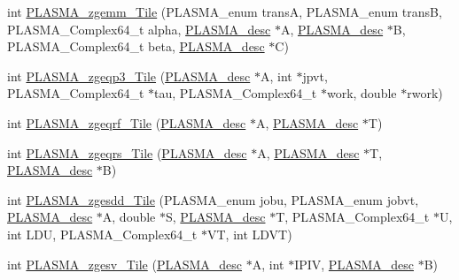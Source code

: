 \begin{DoxyCompactItemize}
\item 
int \hyperlink{group__PLASMA__Complex64__t__Tile_ga988b90795ec2367dc11590bc5dd05ada_ga988b90795ec2367dc11590bc5dd05ada}{P\+L\+A\+S\+M\+A\+\_\+zgemm\+\_\+\+Tile} (P\+L\+A\+S\+M\+A\+\_\+enum trans\+A, P\+L\+A\+S\+M\+A\+\_\+enum trans\+B, P\+L\+A\+S\+M\+A\+\_\+\+Complex64\+\_\+t alpha, \hyperlink{structplasma__desc__t}{P\+L\+A\+S\+M\+A\+\_\+desc} $\ast$A, \hyperlink{structplasma__desc__t}{P\+L\+A\+S\+M\+A\+\_\+desc} $\ast$B, P\+L\+A\+S\+M\+A\+\_\+\+Complex64\+\_\+t beta, \hyperlink{structplasma__desc__t}{P\+L\+A\+S\+M\+A\+\_\+desc} $\ast$C)
\item 
int \hyperlink{group__PLASMA__Complex64__t__Tile_gae051c23d919a445b0cc2773c8ffa62be_gae051c23d919a445b0cc2773c8ffa62be}{P\+L\+A\+S\+M\+A\+\_\+zgeqp3\+\_\+\+Tile} (\hyperlink{structplasma__desc__t}{P\+L\+A\+S\+M\+A\+\_\+desc} $\ast$A, int $\ast$jpvt, P\+L\+A\+S\+M\+A\+\_\+\+Complex64\+\_\+t $\ast$tau, P\+L\+A\+S\+M\+A\+\_\+\+Complex64\+\_\+t $\ast$work, double $\ast$rwork)
\item 
int \hyperlink{group__PLASMA__Complex64__t__Tile_gabc10a21174d94b348a2493d6e885be57_gabc10a21174d94b348a2493d6e885be57}{P\+L\+A\+S\+M\+A\+\_\+zgeqrf\+\_\+\+Tile} (\hyperlink{structplasma__desc__t}{P\+L\+A\+S\+M\+A\+\_\+desc} $\ast$A, \hyperlink{structplasma__desc__t}{P\+L\+A\+S\+M\+A\+\_\+desc} $\ast$T)
\item 
int \hyperlink{group__PLASMA__Complex64__t__Tile_gac9063541a51dbee5a3e51ea774d30de9_gac9063541a51dbee5a3e51ea774d30de9}{P\+L\+A\+S\+M\+A\+\_\+zgeqrs\+\_\+\+Tile} (\hyperlink{structplasma__desc__t}{P\+L\+A\+S\+M\+A\+\_\+desc} $\ast$A, \hyperlink{structplasma__desc__t}{P\+L\+A\+S\+M\+A\+\_\+desc} $\ast$T, \hyperlink{structplasma__desc__t}{P\+L\+A\+S\+M\+A\+\_\+desc} $\ast$B)
\item 
int \hyperlink{group__PLASMA__Complex64__t__Tile_gac3315a1682fa76024dceaa47833f28d8_gac3315a1682fa76024dceaa47833f28d8}{P\+L\+A\+S\+M\+A\+\_\+zgesdd\+\_\+\+Tile} (P\+L\+A\+S\+M\+A\+\_\+enum jobu, P\+L\+A\+S\+M\+A\+\_\+enum jobvt, \hyperlink{structplasma__desc__t}{P\+L\+A\+S\+M\+A\+\_\+desc} $\ast$A, double $\ast$S, \hyperlink{structplasma__desc__t}{P\+L\+A\+S\+M\+A\+\_\+desc} $\ast$T, P\+L\+A\+S\+M\+A\+\_\+\+Complex64\+\_\+t $\ast$U, int L\+D\+U, P\+L\+A\+S\+M\+A\+\_\+\+Complex64\+\_\+t $\ast$V\+T, int L\+D\+V\+T)
\item 
int \hyperlink{group__PLASMA__Complex64__t__Tile_gae332d3896516a34f413881d7383506d4_gae332d3896516a34f413881d7383506d4}{P\+L\+A\+S\+M\+A\+\_\+zgesv\+\_\+\+Tile} (\hyperlink{structplasma__desc__t}{P\+L\+A\+S\+M\+A\+\_\+desc} $\ast$A, int $\ast$I\+P\+I\+V, \hyperlink{structplasma__desc__t}{P\+L\+A\+S\+M\+A\+\_\+desc} $\ast$B)

\end{DoxyCompactItemize}
